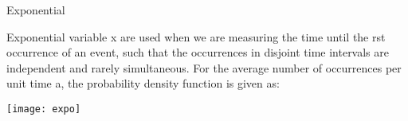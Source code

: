 \begin{frame}{Exponential}

Exponential variable x are used when we are measuring the time until
the  rst occurrence of an event, such that the occurrences in disjoint
time intervals are independent and rarely simultaneous. For the
average number of occurrences per unit time a, the probability density
function is given as:
\begin{center}
\texttt{[image: expo]}
\end{center}
\end{frame}



